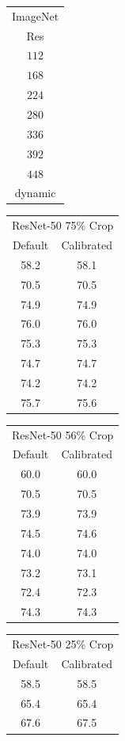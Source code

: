 \begin{table}[t]
    \begin{tabular}{c|}
    ImageNet\\
    Res \\
    \hline
    $112$ \\ 
    $168$ \\ 
    $224$ \\ 
    $280$ \\ 
    $336$ \\ 
    $392$ \\ 
    $448$ \\
    dynamic\\
    \end{tabular}
    \begin{tabular}{|c|c|}
    \multicolumn{2}{|c|}{ ResNet-50 75\% Crop}\\
    Default & Calibrated \\
    \hline
    58.2 & 58.1\\
    70.5 & 70.5\\ 
    74.9 & 74.9\\ 
    76.0 & 76.0\\ 
    75.3 & 75.3\\ 
    74.7 & 74.7\\ 
    74.2 & 74.2\\
    75.7 & 75.6\\ 
    \end{tabular}
    \begin{tabular}{|c|c|}
    \multicolumn{2}{|c|}{ ResNet-50 56\% Crop}\\
    Default & Calibrated  \\
    \hline
    60.0 & 60.0\\ 
    70.5 & 70.5\\ 
    73.9 & 73.9\\ 
    74.5 & 74.6\\ 
    74.0 & 74.0\\ 
    73.2 & 73.1\\ 
    72.4 & 72.3\\
    74.3 & 74.3 \\ 
    \end{tabular}
    \begin{tabular}{|c|c|}
    \multicolumn{2}{|c|}{ ResNet-50 25\% Crop}\\
    Default & Calibrated  \\
    \hline
    58.5 & 58.5 \\ 
    65.4 & 65.4\\ 
    67.6 & 67.5\\ 

\end{tabular}
\end{table}
